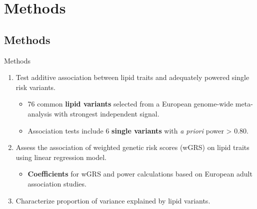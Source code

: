 \documentclass[pdf]{beamer}\usepackage[]{graphicx}\usepackage[]{color}
\begin{document}
\section{Methods}

\subsection{Methods}

\begin{frame}{Methods}
        
        \begin{enumerate}[1.]
          \item Test additive association between lipid traits and adequately powered single risk variants.
            \begin{itemize}
              \item 76 common \textbf{lipid variants} selected from a European genome-wide meta-analysis with strongest independent signal.
              \item Association tests include 6 \textbf{single variants} with \textit{a priori} power > 0.80.
            \end{itemize}
          \item Assess the association of weighted genetic risk scores (wGRS) on lipid traits using linear regression model.
       \begin{itemize}
           \item \textbf{Coefficients} for wGRS and power calculations based on European adult association studies.
              \end{itemize}

          \item Characterize proportion of variance explained by lipid variants.
          \end{enumerate}
\end{frame}

\end{document}
